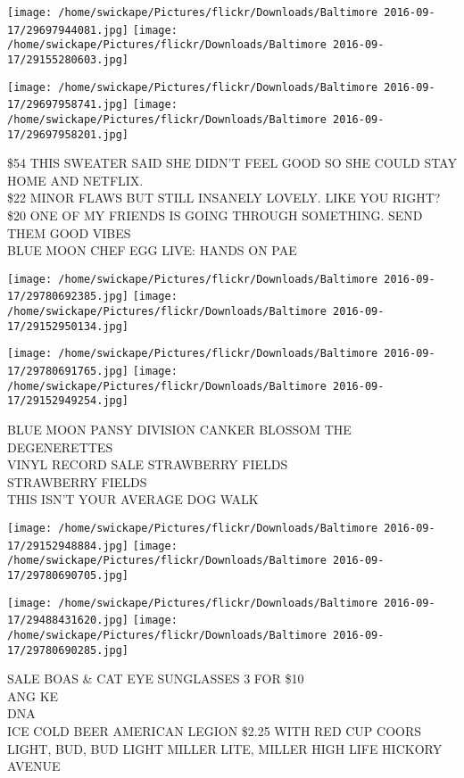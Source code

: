 \documentclass[10pt,letterpaper]{article}
\begin{document}
\texttt{[image: /home/swickape/Pictures/flickr/Downloads/Baltimore 2016-09-17/29697944081.jpg]}
\texttt{[image: /home/swickape/Pictures/flickr/Downloads/Baltimore 2016-09-17/29155280603.jpg]}

\texttt{[image: /home/swickape/Pictures/flickr/Downloads/Baltimore 2016-09-17/29697958741.jpg]}
\texttt{[image: /home/swickape/Pictures/flickr/Downloads/Baltimore 2016-09-17/29697958201.jpg]}

\$54 THIS SWEATER SAID SHE DIDN'T FEEL GOOD SO SHE COULD STAY HOME AND NETFLIX.\\
\$22 MINOR FLAWS BUT STILL INSANELY LOVELY.  LIKE YOU RIGHT?\\
\$20 ONE OF MY FRIENDS IS GOING THROUGH SOMETHING.  SEND THEM GOOD VIBES\\
BLUE MOON CHEF EGG LIVE: HANDS ON PAE
\pagebreak

\texttt{[image: /home/swickape/Pictures/flickr/Downloads/Baltimore 2016-09-17/29780692385.jpg]}
\texttt{[image: /home/swickape/Pictures/flickr/Downloads/Baltimore 2016-09-17/29152950134.jpg]}

\texttt{[image: /home/swickape/Pictures/flickr/Downloads/Baltimore 2016-09-17/29780691765.jpg]}
\texttt{[image: /home/swickape/Pictures/flickr/Downloads/Baltimore 2016-09-17/29152949254.jpg]}

BLUE MOON PANSY DIVISION CANKER BLOSSOM THE DEGENERETTES\\
VINYL RECORD SALE STRAWBERRY FIELDS\\
STRAWBERRY FIELDS\\
THIS ISN'T YOUR AVERAGE DOG WALK
\pagebreak

\texttt{[image: /home/swickape/Pictures/flickr/Downloads/Baltimore 2016-09-17/29152948884.jpg]}
\texttt{[image: /home/swickape/Pictures/flickr/Downloads/Baltimore 2016-09-17/29780690705.jpg]}

\texttt{[image: /home/swickape/Pictures/flickr/Downloads/Baltimore 2016-09-17/29488431620.jpg]}
\texttt{[image: /home/swickape/Pictures/flickr/Downloads/Baltimore 2016-09-17/29780690285.jpg]}

SALE BOAS \& CAT EYE SUNGLASSES 3 FOR \$10\\
ANG KE\\
DNA\\
ICE COLD BEER AMERICAN LEGION \$2.25 WITH RED CUP COORS LIGHT, BUD, BUD LIGHT MILLER LITE, MILLER HIGH LIFE HICKORY AVENUE
\pagebreak
\end{document}

